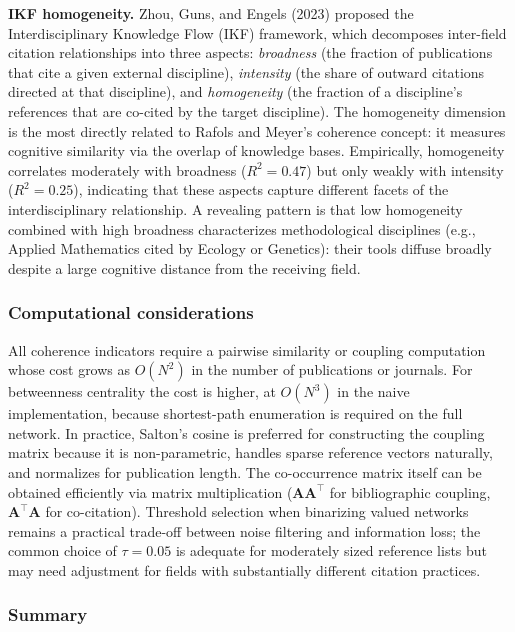 \documentclass[
]{article}
\begin{document}
\textbf{IKF homogeneity.} Zhou, Guns, and Engels (2023) proposed the
Interdisciplinary Knowledge Flow (IKF) framework, which decomposes
inter-field citation relationships into three aspects: \emph{broadness}
(the fraction of publications that cite a given external discipline),
\emph{intensity} (the share of outward citations directed at that
discipline), and \emph{homogeneity} (the fraction of a discipline's
references that are co-cited by the target discipline). The homogeneity
dimension is the most directly related to Rafols and Meyer's coherence
concept: it measures cognitive similarity via the overlap of knowledge
bases. Empirically, homogeneity correlates moderately with broadness
(\(R^2 = 0.47\)) but only weakly with intensity (\(R^2 = 0.25\)),
indicating that these aspects capture different facets of the
interdisciplinary relationship. A revealing pattern is that low
homogeneity combined with high broadness characterizes methodological
disciplines (e.g., Applied Mathematics cited by Ecology or Genetics):
their tools diffuse broadly despite a large cognitive distance from the
receiving field.

\hypertarget{computational-considerations}{%
\subsubsection{Computational
considerations}\label{computational-considerations}}

All coherence indicators require a pairwise similarity or coupling
computation whose cost grows as \(O(N^2)\) in the number of publications
or journals. For betweenness centrality the cost is higher, at
\(O(N^3)\) in the naive implementation, because shortest-path
enumeration is required on the full network. In practice, Salton's
cosine is preferred for constructing the coupling matrix because it is
non-parametric, handles sparse reference vectors naturally, and
normalizes for publication length. The co-occurrence matrix itself can
be obtained efficiently via matrix multiplication
(\(\mathbf{A}\mathbf{A}^{\!\top}\) for bibliographic coupling,
\(\mathbf{A}^{\!\top}\mathbf{A}\) for co-citation). Threshold selection
when binarizing valued networks remains a practical trade-off between
noise filtering and information loss; the common choice of
\(\tau = 0.05\) is adequate for moderately sized reference lists but may
need adjustment for fields with substantially different citation
practices.

\hypertarget{summary-1}{%
\subsubsection{Summary}\label{summary-1}}
\end{document}
